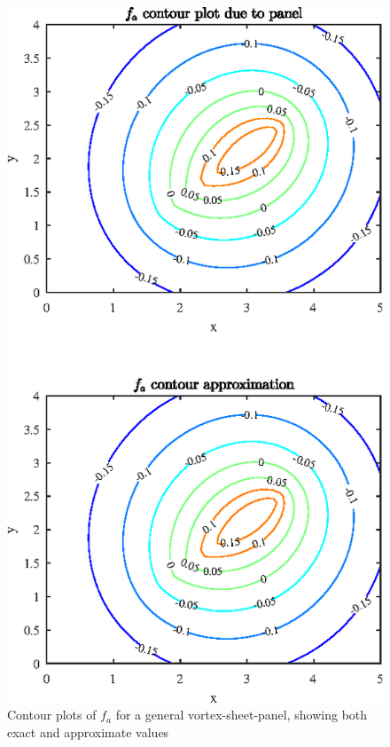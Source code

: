 
  
\pagebreak



\begin{figure}[H]
\centering
\includegraphics[scale=1.55]{graphs/e3g1.eps}
\caption{Contour plots of $f_a$ for a general vortex-sheet-panel, showing both exact and approximate values}
\label{e3g1}
\end{figure}
